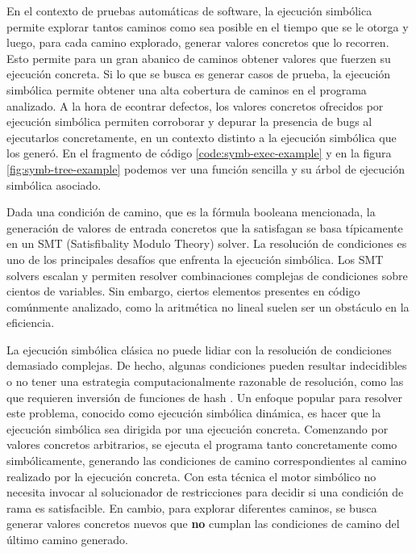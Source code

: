 En el contexto de pruebas automáticas de software, la ejecución simbólica permite explorar tantos caminos como sea posible en el tiempo que se le otorga y luego, para cada camino explorado, generar valores concretos que lo recorren.
Esto permite para un gran abanico de caminos obtener valores que fuerzen su ejecución concreta.
Si lo que se busca es generar casos de prueba, la ejecución simbólica permite obtener una alta cobertura de caminos en el programa analizado.
A la hora de econtrar defectos, los valores concretos ofrecidos por ejecución simbólica permiten corroborar y depurar la presencia de bugs al ejecutarlos concretamente, en un contexto distinto a la ejecución simbólica que los generó.
En el fragmento de código \ref{code:symb-exec-example} y en la figura \ref{fig:symb-tree-example} podemos ver una función sencilla y su árbol de ejecución simbólica asociado.

Dada una condición de camino, que es la fórmula booleana mencionada, la generación de valores de entrada concretos que la satisfagan se basa típicamente en un SMT (Satisfibality Modulo Theory) solver.
La resolución de condiciones es uno de los principales desafíos que enfrenta la ejecución simbólica.
Los SMT solvers escalan y permiten resolver combinaciones complejas de condiciones sobre cientos de variables.
Sin embargo, ciertos elementos presentes en código comúnmente analizado, como la aritmética no lineal suelen ser un obstáculo en la eficiencia.

La ejecución simbólica clásica no puede lidiar con la resolución de condiciones demasiado complejas.
De hecho, algunas condiciones pueden resultar indecidibles o no tener una estrategia computacionalmente razonable de resolución, como las que requieren inversión de funciones de hash \cite{manticore}.
Un enfoque popular para resolver este problema, conocido como ejecución simbólica dinámica, es hacer que la ejecución simbólica sea dirigida por una ejecución concreta.
Comenzando por valores concretos arbitrarios, se ejecuta el programa tanto concretamente como simbólicamente, generando las condiciones de camino correspondientes al camino realizado por la ejecución concreta.
Con esta técnica el motor simbólico no necesita invocar al solucionador de restricciones para decidir si una condición de rama es satisfacible.
En cambio, para explorar diferentes caminos, se busca generar valores concretos nuevos que \textbf{no} cumplan las condiciones de camino del último camino generado.

